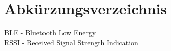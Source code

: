 \chapter*{Abkürzungsverzeichnis}

BLE - Bluetooth Low Energy\\
RSSI - Received Signal Strength Indication\\
